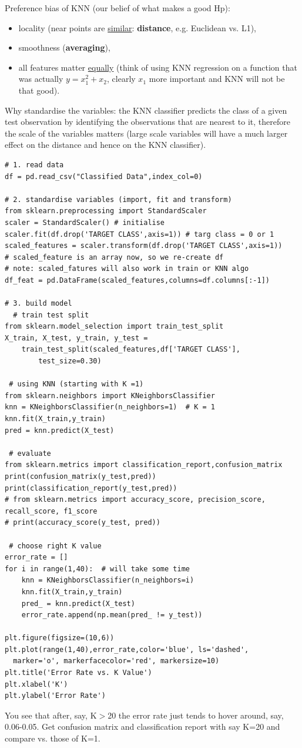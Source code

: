 \documentclass[11pt]{article}
\begin{document}
Preference bias of KNN (our belief of what makes a good Hp):
\begin{itemize}
	\item locality (near points are \underline{similar}: \textbf{distance}, e.g. Euclidean vs. L1),
	\item smoothness (\textbf{averaging}),
	\item all features matter \underline{equally} (think of using KNN regression on a function that was actually $y=x_1^2 + x_2$, clearly $x_1$ more important and KNN will not be that good).
\end{itemize}

Why standardise the variables: the KNN classifier predicts the class of a given test observation by identifying the observations that are nearest to it, therefore the scale of the variables matters (large scale variables will have a much larger effect on the distance and hence on the KNN classifier).
\begin{lstlisting}
# 1. read data
df = pd.read_csv("Classified Data",index_col=0)

# 2. standardise variables (import, fit and transform)
from sklearn.preprocessing import StandardScaler
scaler = StandardScaler() # initialise
scaler.fit(df.drop('TARGET CLASS',axis=1)) # targ class = 0 or 1
scaled_features = scaler.transform(df.drop('TARGET CLASS',axis=1))
# scaled_feature is an array now, so we re-create df
# note: scaled_fatures will also work in train or KNN algo
df_feat = pd.DataFrame(scaled_features,columns=df.columns[:-1])

# 3. build model
  # train test split
from sklearn.model_selection import train_test_split
X_train, X_test, y_train, y_test = 
	train_test_split(scaled_features,df['TARGET CLASS'],
		test_size=0.30)

 # using KNN (starting with K =1)
from sklearn.neighbors import KNeighborsClassifier
knn = KNeighborsClassifier(n_neighbors=1)  # K = 1
knn.fit(X_train,y_train)
pred = knn.predict(X_test)
 
 # evaluate
from sklearn.metrics import classification_report,confusion_matrix
print(confusion_matrix(y_test,pred))
print(classification_report(y_test,pred))
# from sklearn.metrics import accuracy_score, precision_score, recall_score, f1_score
# print(accuracy_score(y_test, pred))

 # choose right K value
error_rate = []
for i in range(1,40):  # will take some time
	knn = KNeighborsClassifier(n_neighbors=i)
	knn.fit(X_train,y_train)
	pred_ = knn.predict(X_test)
	error_rate.append(np.mean(pred_ != y_test))

plt.figure(figsize=(10,6))
plt.plot(range(1,40),error_rate,color='blue', ls='dashed', 
  marker='o', markerfacecolor='red', markersize=10)
plt.title('Error Rate vs. K Value')
plt.xlabel('K')
plt.ylabel('Error Rate')
\end{lstlisting}
You see that after, say, K$>$20 the error rate just tends to hover around, say, 0.06-0.05. Get confusion matrix and classification report with say K=20 and compare vs. those of K=1.
\end{document}
